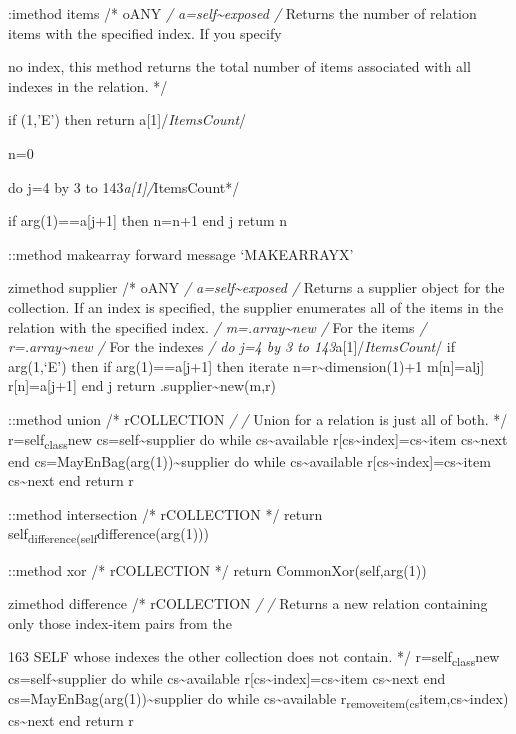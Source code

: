 :imethod items /* oANY \emph{/ a=self\textasciitilde exposed /} Returns
the number of relation items with the specified index. If you specify

no index, this method returns the total number of items associated with
all indexes in the relation. */

if \arg(1,'E') then return a{[}1{]}/\emph{ItemsCount}/

n=0

do j=4 by 3 to 143\emph{a{[}1{]}/}ItemsCount*/

if arg(1)==a{[}j+1{]} then n=n+1 end j retum n

::method makearray forward message `MAKEARRAYX'

zimethod supplier /* oANY \emph{/ a=self\textasciitilde exposed /}
Returns a supplier object for the collection. If an index is specified,
the supplier enumerates all of the items in the relation with the
specified index. \emph{/ m=.array\textasciitilde new /} For the items
\emph{/ r=.array\textasciitilde new /} For the indexes \emph{/ do j=4 by
3 to 143}a{[}1{]}/\emph{ItemsCount}/ if arg(1,`E') then if
arg(1)==a{[}j+1{]} then iterate n=r\textasciitilde dimension(1)+1
m{[}n{]}=alj{]} r{[}n{]}=a{[}j+1{]} end j return
.supplier\textasciitilde new(m,r)

::method union /* rCOLLECTION \emph{/ /} Union for a relation is just
all of both. */ r=self\textsubscript{class}new
cs=self\textasciitilde supplier do while cs\textasciitilde available
r{[}cs\textasciitilde index{]}=cs\textasciitilde item
cs\textasciitilde next end cs=MayEnBag(arg(1))\textasciitilde supplier
do while cs\textasciitilde available
r{[}cs\textasciitilde index{]}=cs\textasciitilde item
cs\textasciitilde next end return r

::method intersection /* rCOLLECTION */ return
self\textsubscript{difference(self}difference(arg(1)))

::method xor /* rCOLLECTION */ return CommonXor(self,arg(1))

zimethod difference /* rCOLLECTION \emph{/ /} Returns a new relation
containing only those index-item pairs from the

163 SELF whose indexes the other collection does not contain. */
r=self\textsubscript{class}new cs=self\textasciitilde supplier do while
cs\textasciitilde available
r{[}cs\textasciitilde index{]}=cs\textasciitilde item
cs\textasciitilde next end cs=MayEnBag(arg(1))\textasciitilde supplier
do while cs\textasciitilde available
r\textsubscript{removeitem(cs}item,cs\textasciitilde index)
cs\textasciitilde next end return r

